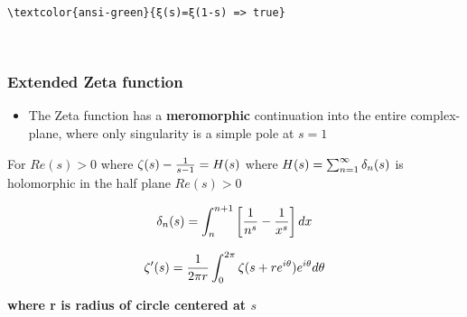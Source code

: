 \documentclass[11pt]{article}
\providecommand{\tightlist}{%
      \setlength{\itemsep}{0pt}\setlength{\parskip}{0pt}}
\newcommand{\prompt}[4]{
        {\ttfamily\llap{{\color{#2}[#3]:\hspace{3pt}#4}}\vspace{-\baselineskip}}
    }
\begin{document}
    \begin{Verbatim}[commandchars=\\\{\}]
\textcolor{ansi-green}{ξ(s)=ξ(1-s) => true}
    \end{Verbatim}
 
            
\prompt{Out}{outcolor}{4}{}
    
    \begin{center}
    \end{center}
    { \hspace*{\fill} \\}
    

    \subsubsection{Extended Zeta function}\label{extended-zeta-function}

\begin{itemize}
\tightlist
\item
  The Zeta function has a \textbf{meromorphic} continuation into the
  entire complex-plane, where only singularity is a simple pole at
  \(s=1\)
\end{itemize}

For \(Re(s)>0\) where \(\Large\zeta(s)-\frac{1}{s-1}=H(s)\) where
\(\Large H(s)=\sum_{n=1}^{\infty}\delta_{n}(s)\) is holomorphic in the
half plane \(Re(s)>0\)

\[\large\delta_{n}(s)=\int_{n}^{n+1}\left[\frac{1}{n^{s}}-\frac{1}{x^s}\right]dx\]

\[\Huge\zeta^{\prime}(s)=\frac{1}{2\pi r}\int_{0}^{2\pi}\zeta(s+re^{i\theta})e^{i\theta}d\theta\]

\textbf{where r is radius of circle centered at \(s\)}


    
    
    
\end{document}
